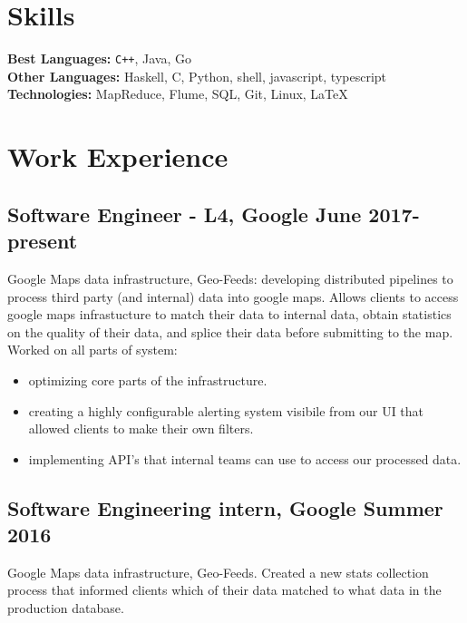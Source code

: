 \documentclass[5pt]{resume}
\begin{document}


{\color{titleColor}\section{Skills}}
\noindent\textbf{Best Languages:} {\color{default} \verb!C++!, Java, Go }\\
\textbf{Other Languages:} {\color{default} Haskell, C, Python, shell, javascript, typescript} \\
\textbf{Technologies:} {\color{default} MapReduce, Flume, SQL, Git, Linux, \LaTeX } 

{\color{titleColor} \section{Work Experience}}

\subsection{\textbf{Software Engineer - L4, Google \hfill June 2017-present}}
{\color{default} Google Maps data infrastructure, Geo-Feeds: developing 
  distributed pipelines to process third party (and internal) data into google 
  maps. Allows clients to access google maps infrastucture to match their data 
  to internal data, obtain statistics on the quality of their data, and splice
  their data before submitting to the map.
  Worked on all parts of system:
  \begin{itemize}
	\itemsep0em 
  	\item optimizing core parts of the infrastructure.
  	\item creating a highly configurable alerting system visibile from our UI that allowed clients to make their own filters.
	\item implementing API's that internal teams can use to access our processed data.
\end{itemize}
}

\subsection{\textbf{Software Engineering intern, Google \hfill Summer 2016}}
{\color{default} Google Maps data infrastructure, Geo-Feeds. Created a new stats collection process that informed clients which of their data matched to what data in the production database.}
\end{document}
